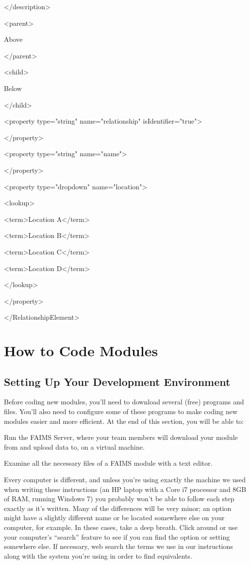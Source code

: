 </description>

<parent>

Above

</parent>

<child>

Below

</child>

<property type="string" name="relationship" isIdentifier="true">

</property>

<property type="string" name="name">

</property>

<property type="dropdown" name="location">

<lookup>

<term>Location A</term>

<term>Location B</term>

<term>Location C</term>

<term>Location D</term>

</lookup>

</property>

</RelationshipElement>

\section[how-to-code-modules]{How to Code Modules}

\subsection[setting-up-your-development-environment]{Setting Up Your Development Environment}

Before coding new modules, you'll need to download several (free) programs and files. You'll also need to configure some of these programs to make coding new modules easier and more efficient. At the end of this section, you will be able to:

\startitemize
\item
  \startblockquote
  Run the FAIMS Server, where your team members will download your module from and upload data to, on a virtual machine.
  \stopblockquote
\item
  \startblockquote
  Examine all the necessary files of a FAIMS module with a text editor.
  \stopblockquote
\stopitemize


Every computer is different, and unless you're using exactly the machine we used when writing these instructions (an HP laptop with a Core i7 processor and 8GB of RAM, running Windows 7) you probably won't be able to follow each step exactly as it's written. Many of the differences will be very minor; an option might have a slightly different name or be located somewhere else on your computer, for example. In these cases, take a deep breath. Click around or use your computer's “search” feature to see if you can find the option or setting somewhere else. If necessary, web search the terms we use in our instructions along with the system you're using in order to find equivalents.

